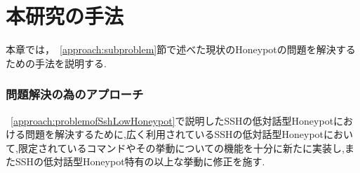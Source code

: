 \chapter{本研究の手法}
\label{method}

本章では，~\ref{approach:subproblem}節で述べた現状のHoneypotの問題を解決するための手法を説明する.

\subsection{問題解決の為のアプローチ}
\label{method:approach}
 ~\ref{approach:problemofSshLowHoneypot}で説明したSSHの低対話型Honeypotにおける問題を解決するために,広く利用されているSSHの低対話型Honeypotにおいて,限定されているコマンドやその挙動についての機能を十分に新たに実装し,またSSHの低対話型Honeypot特有の以上な挙動に修正を施す.

